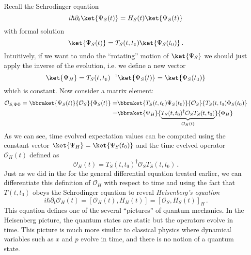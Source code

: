 
Recall the Schrodinger equation
\begin{equation}
  i \hbar \partial_t \ket{\Psi_S(t)} = H_S(t) \ket{\Psi_S(t)}
\end{equation}
with formal solution
\begin{equation}
  \ket{\Psi_S(t)} = T_S(t, t_0) \ket{\Psi_S(t_0)} \, .
\end{equation}
Intuitively, if we want to undo the ``rotating'' motion of $\ket{\Psi_S}$ we should just apply the inverse of the evolution, i.e. we define a new vector
\begin{equation}
  \ket{\Psi_H} = T_S(t, t_0)^{-1} \ket{\Psi_S(t)} = \ket{\Psi_S(t_0)}
\end{equation}
which is constant.
Now consider a matrix element:
\begin{align}
  \mathcal{O}_{S,\Psi\Phi} =
  \bbraket{\Psi_{S}(t)}{\mathcal{O}_S}{\Phi_{S}(t)}
  =& \bbraket{T_S(t, t_0) \Psi_S(t_0)}{\mathcal{O}_S}{T_S(t, t_0) \Phi_S(t_0)} \nonumber \\
  =& \bbraket{\Psi_H}{\underbrace{T_S(t, t_0)^\dagger \mathcal{O}_S T_S(t, t_0)}_{\mathcal{O}_H(t)}}{\Phi_H}
\end{align}
As we can see, time evolved expectation values can be computed using the constant vector $\ket{\Psi_H} = \ket{\Psi_S(t_0)}$ and the time evelved operator $\mathcal{O}_H(t)$ defined as
\begin{equation}
  \mathcal{O}_H(t) = T_S(t, t_0)^\dagger \mathcal{O}_S T_S(t, t_0) \, .
\end{equation}
Just as we did in the for the general differential equation treated earlier, we can differentiate this definition of $\mathcal{O}_H$ with respect to time and using the fact that $T(t, t_0)$ obeys the Schrodinger equation to reveal \emph{Heisenberg's equation}
\begin{equation}
  i \hbar \partial_t \mathcal{O}_H(t)
  = \left[ \mathcal{O}_H(t), H_H(t) \right]
  = \left[ \mathcal{O}_S, H_S(t) \right]_H
  \, .
\end{equation}
This equation defines one of the several ``pictures'' of quantum mechanics.
In the Heisenberg picture, the quantum states are static but the operators evolve in time.
This picture is much more similar to classical physics where dynamical variables such as $x$ and $p$ evolve in time, and there is no notion of a quantum state.


